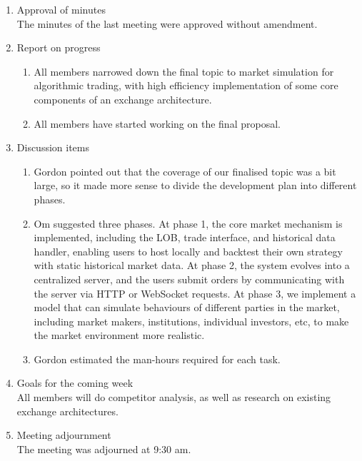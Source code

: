 \documentclass[12pt,a4paper]{article}
\begin{document}
\begin{enumerate}
\item Approval of minutes\\
The minutes of the last meeting were approved without amendment.\\
\item Report on progress
\begin{enumerate}
\item All members narrowed down the final topic to market simulation for algorithmic trading, with high efficiency implementation of some core components of an exchange architecture.\\
\item All members have started working on the final proposal.\\
\end{enumerate}
\item Discussion items
\begin{enumerate}
\item Gordon pointed out that the coverage of our finalised topic was a bit large, so it made more sense to divide the development plan into different phases.\\
\item Om suggested three phases. At phase 1, the core market mechanism is implemented, including the LOB, trade interface, and historical data handler, enabling users to host locally and backtest their own strategy with static historical market data. At phase 2, the system evolves into a centralized server, and the users submit orders by communicating with the server via HTTP or WebSocket requests. At phase 3, we implement a model that can simulate behaviours of different parties in the market, including market makers, institutions, individual investors, etc, to make the market environment more realistic.\\
\item Gordon estimated the man-hours required for each task.\\
\end{enumerate}
\item Goals for the coming week\\
All members will do competitor analysis, as well as research on existing exchange architectures.\\
\item Meeting adjournment\\
The meeting was adjourned at 9:30 am.
\end{enumerate}
\end{document}
